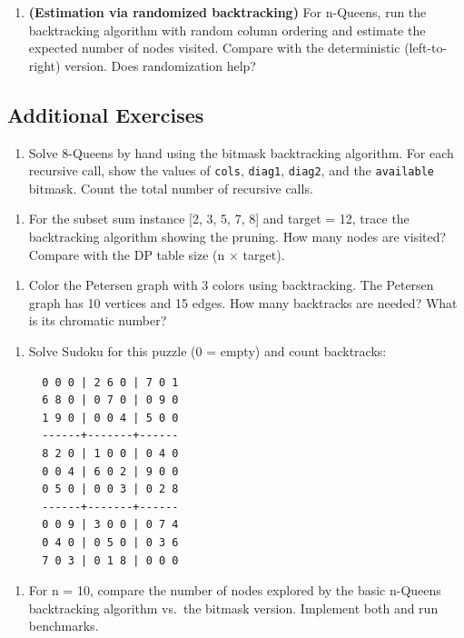\begin{enumerate}
\item \textbf{(Estimation via randomized backtracking)} For n-Queens, run the backtracking algorithm with random column ordering and estimate the expected number of nodes visited. Compare with the deterministic (left-to-right) version. Does randomization help?
\end{enumerate}

\subsection{Additional Exercises}

\begin{enumerate}
\item Solve 8-Queens by hand using the bitmask backtracking algorithm. For each recursive call, show the values of \texttt{cols}, \texttt{diag1}, \texttt{diag2}, and the \texttt{available} bitmask. Count the total number of recursive calls.
\end{enumerate}

\begin{enumerate}
\item For the subset sum instance [2, 3, 5, 7, 8] and target = 12, trace the backtracking algorithm showing the pruning. How many nodes are visited? Compare with the DP table size (n $\times$ target).
\end{enumerate}

\begin{enumerate}
\item Color the Petersen graph with 3 colors using backtracking. The Petersen graph has 10 vertices and 15 edges. How many backtracks are needed? What is its chromatic number?
\end{enumerate}

\begin{enumerate}
\item Solve Sudoku for this puzzle (0 = empty) and count backtracks:
\begin{lstlisting}
  0 0 0 | 2 6 0 | 7 0 1
  6 8 0 | 0 7 0 | 0 9 0
  1 9 0 | 0 0 4 | 5 0 0
  ------+-------+------
  8 2 0 | 1 0 0 | 0 4 0
  0 0 4 | 6 0 2 | 9 0 0
  0 5 0 | 0 0 3 | 0 2 8
  ------+-------+------
  0 0 9 | 3 0 0 | 0 7 4
  0 4 0 | 0 5 0 | 0 3 6
  7 0 3 | 0 1 8 | 0 0 0
\end{lstlisting}
\end{enumerate}

\begin{enumerate}
\item For n = 10, compare the number of nodes explored by the basic n-Queens backtracking algorithm vs.\ the bitmask version. Implement both and run benchmarks.
\end{enumerate}

